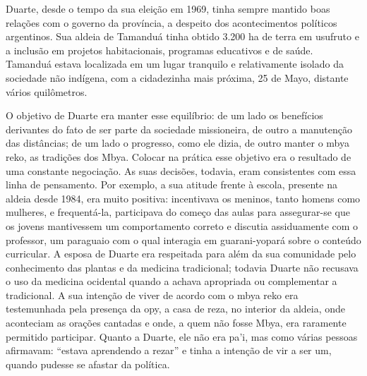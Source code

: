 \documentclass{article}
\begin{document}
Duarte, desde o tempo da sua elei\c{c}\~ao em 1969, tinha sempre mantido
boas rela\c{c}\~oes com o governo da prov\'incia, a despeito dos
acontecimentos pol\'iticos argentinos. Sua aldeia de Tamandu\'a tinha
obtido 3.200 ha de terra em usufruto e a inclus\~ao em projetos
habitacionais, programas educativos e de sa\'ude. Tamandu\'a estava
localizada em um lugar tranquilo e relativamente isolado da sociedade
n\~ao ind\'igena, com a cidadezinha mais pr\'oxima, 25 de Mayo,
distante v\'arios quil\^ometros. 

O objetivo de Duarte era manter esse equil\'ibrio: de um lado os
benef\'icios derivantes do fato de ser parte da sociedade missioneira,
de outro a manuten\c{c}\~ao das dist\^ancias; de um lado o progresso,
como ele dizia, de outro manter o mbya reko, as tradi\c{c}\~oes dos
Mbya. Colocar na pr\'atica esse objetivo era o resultado de uma
constante negocia\c{c}\~ao. As suas decis\~oes, todavia, eram
consistentes com essa linha de pensamento. Por exemplo, a sua atitude
frente \`a escola, presente na aldeia desde 1984, era muito positiva:
incentivava os meninos, tanto homens como mulheres, e frequent\'a-la,
participava do come\c{c}o das aulas para assegurar-se que os jovens
mantivessem um comportamento correto e discutia assiduamente com o
professor, um paraguaio com o qual interagia em guarani-yopar\'a sobre
o conte\'udo curricular. A esposa de Duarte era respeitada para al\'em
da sua comunidade pelo conhecimento das plantas e da medicina
tradicional; todavia Duarte n\~ao recusava o uso da medicina ocidental
quando a achava apropriada ou complementar a tradicional. A sua
inten\c{c}\~ao de viver de acordo com o mbya reko era testemunhada pela
presen\c{c}a da opy, a casa de reza, no interior da aldeia, onde
aconteciam as ora\c{c}\~oes cantadas e onde, a quem n\~ao fosse Mbya,
era raramente permitido participar. Quanto a Duarte, ele n\~ao era
pa{\textquoteright}i, mas como v\'arias pessoas afirmavam:
{\textquotedblleft}estava aprendendo a rezar{\textquotedblright} e
tinha a inten\c{c}\~ao de vir a ser um, quando pudesse se afastar da
pol\'itica.
\end{document}
